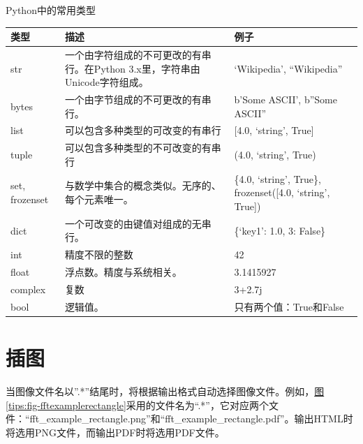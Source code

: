 \documentclass[letterpaper,10pt]{sphinxmanual}
\begin{document}
\begin{threeparttable}
\capstart\caption{Python中的常用类型}

\begin{tabulary}{\linewidth}{|L|L|L|}
\hline
\textbf{
类型
} & \textbf{
描述
} & \textbf{
例子
}\\\hline

str
 & 
一个由字符组成的不可更改的有串行。在Python 3.x里，字符串由Unicode字符组成。
 & 
`Wikipedia', ``Wikipedia''
\\\hline

bytes
 & 
一个由字节组成的不可更改的有串行。
 & 
b'Some ASCII', b''Some ASCII''
\\\hline

list
 & 
可以包含多种类型的可改变的有串行
 & 
{[}4.0, `string', True{]}
\\\hline

tuple
 & 
可以包含多种类型的不可改变的有串行
 & 
(4.0, `string', True)
\\\hline

set, frozenset
 & 
与数学中集合的概念类似。无序的、每个元素唯一。
 & 
\{4.0, `string', True\}, frozenset({[}4.0, `string', True{]})
\\\hline

dict
 & 
一个可改变的由键值对组成的无串行。
 & 
\{`key1': 1.0, 3: False\}
\\\hline

int
 & 
精度不限的整数
 & 
42
\\\hline

float
 & 
浮点数。精度与系统相关。
 & 
3.1415927
\\\hline

complex
 & 
复数
 & 
3+2.7j
\\\hline

bool
 & 
逻辑值。
 & 
只有两个值：True和False
\\\hline
\end{tabulary}

\end{threeparttable}



\section{插图}
\label{tips:sec-tips-figure}\label{tips:id3}\label{tips:-sec-tips-figure}
当图像文件名以''.*''结尾时，将根据输出格式自动选择图像文件。例如，{\hyperref[tips:fig-fftexamplerectangle]{图\ref*{tips:fig-fftexamplerectangle}}}采用的文件名为“.*”，它对应两个文件：“fft\_example\_rectangle.png”和“fft\_example\_rectangle.pdf”。输出HTML时将选用PNG文件，而输出PDF时将选用PDF文件。
\end{document}
